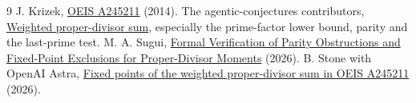 \documentclass[11pt]{article}
\begin{document}
\small\begin{thebibliography}{9}
 J. Krizek, \href{https://oeis.org/A245211}{OEIS A245211}
(2014).
 The agentic-conjectures contributors,
\href{https://github.com/umaia1234/agentic-conjectures/blob/78a56edb19eadb6a23f5f791273f016e0b3e0f50/problems/oeis-a245211/DETAILS.md}{Weighted proper-divisor sum},
especially the prime-factor lower bound, parity and the last-prime test.
 M. A. Sugui,
\href{https://doi.org/10.5281/zenodo.24437886}{Formal Verification of Parity Obstructions and Fixed-Point Exclusions for Proper-Divisor Moments} (2026).
 B. Stone with OpenAI Astra,
\href{https://github.com/blakestone-x/math/blob/a80ee14b88981065189113eace98e1b8fba58c28/A245211/A245211-research.pdf}{Fixed points of the weighted proper-divisor sum in OEIS A245211} (2026).
\end{thebibliography}
\end{document}
